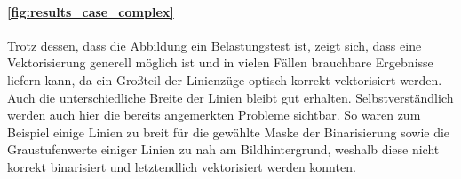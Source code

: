 \paragraph{\autoref{fig:results_case_complex}}
Trotz dessen, dass die Abbildung ein Belastungstest ist, zeigt sich, dass eine Vektorisierung generell möglich ist und in vielen Fällen brauchbare Ergebnisse liefern kann, da ein Großteil der Linienzüge optisch korrekt vektorisiert werden.
Auch die unterschiedliche Breite der Linien bleibt gut erhalten.
Selbstverständlich werden auch hier die bereits angemerkten Probleme sichtbar.
So waren zum Beispiel einige Linien zu breit für die gewählte Maske der Binarisierung sowie die Graustufenwerte einiger Linien zu nah am Bildhintergrund, weshalb diese nicht korrekt binarisiert und letztendlich vektorisiert werden konnten.
